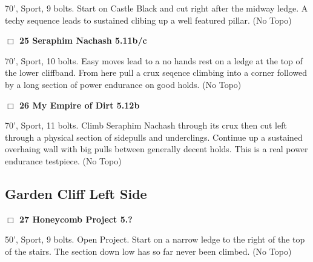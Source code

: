 \begin{multicols}{2}
\begin{adjustwidth}{1.3em}{}
70', Sport, 9 bolts. Start on Castle Black and cut right after the midway ledge. A techy sequence leads to sustained clibing up a well featured pillar.
  (No Topo)
\end{adjustwidth}




\needspace{2em}
\label{rt:Seraphim Nachash}
\colorbox{RoyalBlue!20}{
\parbox{0.95\linewidth}{
\hspace{-1ex}\textbf{$\Box$
25 Seraphim Nachash 5.11b/c  
}}}
\begin{adjustwidth}{1.3em}{}			

70', Sport, 10 bolts. Easy moves lead to a no hands rest on a ledge at the top of the lower cliffband. From here pull a crux seqence climbing into a corner followed by a long section of power endurance on good holds.
  (No Topo)
\end{adjustwidth}




\needspace{2em}
\label{rt:My Empire of Dirt}
\colorbox{Goldenrod!20}{
\parbox{0.95\linewidth}{
\hspace{-1ex}\textbf{$\Box$
26 My Empire of Dirt 5.12b  
}}}
\begin{adjustwidth}{1.3em}{}			

70', Sport, 11 bolts. Climb Seraphim Nachash through its crux then cut left through a physical section of sidepulls and underclings. Continue up a sustained overhaing wall with big pulls between generally decent holds. This is a real power endurance testpiece.
  (No Topo)
\end{adjustwidth}





\needspace{10em}
\subsection*{Garden Cliff Left Side}\label{bf:Garden Cliff Left Side}




\needspace{2em}
\label{rt:Honeycomb Project}
\colorbox{black!20}{
\parbox{0.95\linewidth}{
\hspace{-1ex}\textbf{$\Box$
27 Honeycomb Project 5.?  
}}}
\begin{adjustwidth}{1.3em}{}			

50', Sport, 9 bolts. Open Project. Start on a narrow ledge to the right of the top of the stairs. The section down low has so far never been climbed.
  (No Topo)
\end{adjustwidth}



\end{multicols}

